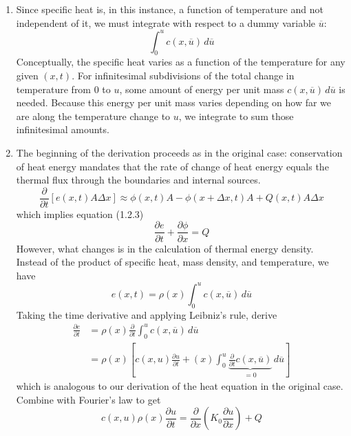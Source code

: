 \documentclass[a4paper]{article}
\begin{document}
\begin{enumerate}[label=(\alph*)]
	\item Since specific heat is, in this instance, a function of temperature and not independent of it, we must integrate with respect to a dummy variable \( \overline{u} \):
	\[
		\int^{u}_{0} c \!\left( x,\overline{u} \right) \, d \overline{u}  
	\]
	Conceptually, the specific heat varies as a function of the temperature for any given \( \!\left( x,t \right) \). For infinitesimal subdivisions of the total change in temperature from \( 0 \) to \( u \), some amount of energy per unit mass \( c \!\left( x,\overline{u} \right) \, d \overline{u} \) is needed. Because this energy per unit mass varies depending on how far we are along the temperature change to \( u \), we integrate to sum those infinitesimal amounts.
	\item The beginning of the derivation proceeds as in the original case: conservation of heat energy mandates that the rate of change of heat energy equals the thermal flux through the boundaries and internal sources.
	\[
		\frac{\partial }{\partial t} \!\left[ e \!\left( x,t \right)A \Delta x \right] \approx \phi \!\left( x,t \right)A - \phi \!\left( x + \Delta x,t \right)A + Q \!\left( x,t \right)A \Delta x
	\]
	which implies equation (1.2.3)
	\[
		\frac{\partial e}{\partial t} + \frac{\partial \phi}{\partial x} = Q 
	\]
	However, what changes is in the calculation of thermal energy density. Instead of the product of specific heat, mass density, and temperature, we have
	\[
		e \!\left( x,t \right) = \rho \!\left( x \right) \int^{u}_{0} c \!\left( x,\overline{u} \right) \, d \overline{u} 
	\]
	Taking the time derivative and applying Leibniz's rule, derive
	\begin{align*}
		\frac{\partial e}{\partial t} & = \rho \!\left( x \right) \frac{\partial }{\partial t}\int^{u}_{0} c \!\left( x,\overline{u} \right) \, d \overline{u} \\
					      & = \rho \!\left( x \right)\!\left[ c \!\left( x,u \right) \frac{\partial u}{\partial t} + \!\left( x \right)\int^{u}_{0} \underbrace{\frac{\partial }{\partial t}c \!\left( x,\overline{u} \right)}_{= 0} \, d \overline{u} \right]
	\end{align*}
	which is analogous to our derivation of the heat equation in the original case. Combine with Fourier's law to get
	\[
		c \!\left( x,u \right) \rho \!\left( x \right) \frac{\partial u}{\partial t} = \frac{\partial }{\partial x} \!\left( K_{0} \frac{\partial u}{\partial x} \right) + Q
	\]
\end{enumerate}
\end{document}
